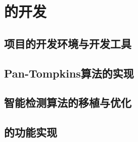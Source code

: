 \chapter{\app 的开发}\label{ch:dev}


\section{项目的开发环境与开发工具}\label{sec:env}



\section{Pan-Tompkins算法的实现}\label{sec:pan-tompkins}



\section{智能检测算法的移植与优化}\label{sec:ai}



\section{\app 的功能实现}\label{sec:func}

